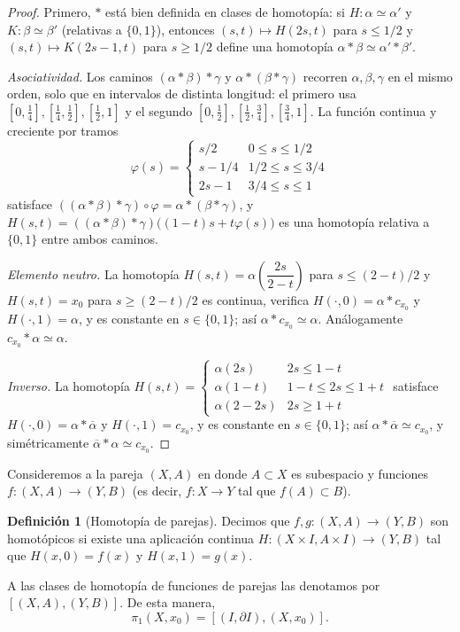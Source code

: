 \documentclass[11pt,a4paper]{article}
\theoremstyle{plain}
\theoremstyle{definition}
\newtheorem{definition}[theorem]{Definición}
\theoremstyle{remark}
\begin{document}
\begin{proof}
Primero, $*$ está bien definida en clases de homotopía: si
$H:\alpha\simeq\alpha'$ y $K:\beta\simeq\beta'$ (relativas a $\{0,1\}$),
entonces $(s,t)\mapsto H(2s,t)$ para $s\le1/2$ y $(s,t)\mapsto K(2s-1,t)$
para $s\ge1/2$ define una homotopía $\alpha*\beta\simeq\alpha'*\beta'$.

\emph{Asociatividad.} Los caminos $(\alpha*\beta)*\gamma$ y
$\alpha*(\beta*\gamma)$ recorren $\alpha,\beta,\gamma$ en el mismo orden,
solo que en intervalos de distinta longitud: el primero usa
$[0,\tfrac14],[\tfrac14,\tfrac12],[\tfrac12,1]$ y el segundo
$[0,\tfrac12],[\tfrac12,\tfrac34],[\tfrac34,1]$. La función continua y
creciente por tramos
\[
\varphi(s)=\begin{cases}
s/2 & 0\le s\le1/2\\
s-1/4 & 1/2\le s\le3/4\\
2s-1 & 3/4\le s\le1
\end{cases}
\]
satisface $((\alpha*\beta)*\gamma)\circ\varphi=\alpha*(\beta*\gamma)$, y
$H(s,t)=((\alpha*\beta)*\gamma)\big((1-t)s+t\varphi(s)\big)$ es una
homotopía relativa a $\{0,1\}$ entre ambos caminos.

\emph{Elemento neutro.} La homotopía
$H(s,t)=\alpha\!\left(\dfrac{2s}{2-t}\right)$ para $s\le(2-t)/2$ y
$H(s,t)=x_0$ para $s\ge(2-t)/2$ es continua, verifica $H(\cdot,0)=\alpha*c_{x_0}$
y $H(\cdot,1)=\alpha$, y es constante en $s\in\{0,1\}$; así
$\alpha*c_{x_0}\simeq\alpha$. Análogamente $c_{x_0}*\alpha\simeq\alpha$.

\emph{Inverso.} La homotopía
$H(s,t)=\begin{cases}\alpha(2s) & 2s\le1-t\\ \alpha(1-t) & 1-t\le2s\le1+t\\ \alpha(2-2s) & 2s\ge1+t\end{cases}$
satisface $H(\cdot,0)=\alpha*\overline\alpha$ y $H(\cdot,1)=c_{x_0}$, y es
constante en $s\in\{0,1\}$; así $\alpha*\overline\alpha\simeq c_{x_0}$, y
simétricamente $\overline\alpha*\alpha\simeq c_{x_0}$.
\end{proof}

Consideremos a la pareja $(X,A)$ en donde $A\subset X$ es subespacio y
funciones $f:(X,A)\to(Y,B)$ (es decir, $f:X\to Y$ tal que $f(A)\subset B$).

\begin{definition}[Homotopía de parejas]
\label{def:homotopia-parejas}
Decimos que $f,g:(X,A)\to(Y,B)$ son homotópicos si existe una aplicación
continua $H:(X\times I, A\times I)\to(Y,B)$ tal que $H(x,0)=f(x)$ y
$H(x,1)=g(x)$.

A las clases de homotopía de funciones de parejas las denotamos por
$[(X,A),(Y,B)]$. De esta manera,
\[
\pi_1(X,x_0)=[(I,\partial I),(X,x_0)].
\]
\end{definition}
\end{document}
